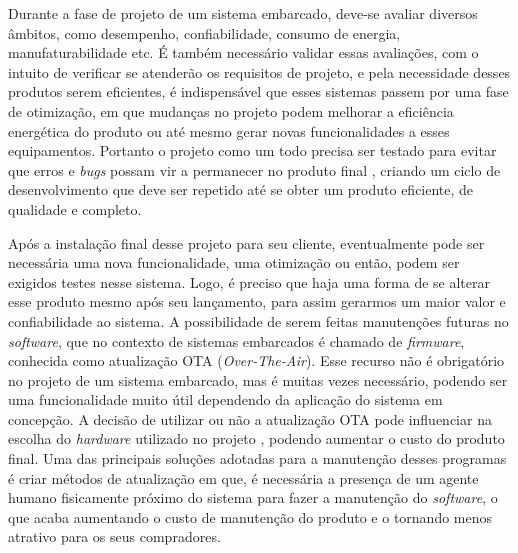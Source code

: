 

Durante a fase de projeto de um sistema embarcado, deve-se avaliar diversos âmbitos, como desempenho, confiabilidade, consumo de energia, manufaturabilidade etc. É também necessário validar essas avaliações, com o intuito de verificar se atenderão os requisitos de projeto, e pela necessidade desses produtos serem eficientes, é indispensável que esses sistemas passem por uma fase de otimização, em que mudanças no projeto podem melhorar a eficiência energética do produto ou até mesmo gerar novas funcionalidades a esses equipamentos. Portanto o projeto como um todo precisa ser testado para evitar que erros e \textit{bugs} possam vir a permanecer no produto final \cite{Marwedel2006}, criando um ciclo de desenvolvimento que deve ser repetido até se obter um produto eficiente, de qualidade e completo.

Após a instalação final desse projeto para seu cliente, eventualmente pode ser necessária uma nova funcionalidade, uma otimização ou então, podem ser exigidos testes nesse sistema. Logo, é preciso que haja uma forma de se alterar esse produto mesmo após seu lançamento, para assim gerarmos um maior valor e confiabilidade ao sistema.
A possibilidade de serem feitas manutenções futuras no \textit{software}, que no contexto de sistemas embarcados é chamado de \textit{firmware}, conhecida como atualização OTA (\textit{Over-The-Air}). Esse recurso não é obrigatório no projeto de um sistema embarcado, mas é muitas vezes necessário, podendo ser uma funcionalidade muito útil dependendo da aplicação do sistema em concepção. A decisão de utilizar ou não a atualização OTA pode influenciar na escolha do \textit{hardware} utilizado no projeto \cite{Ball2002}, 
podendo aumentar o custo do produto final.
Uma das principais soluções adotadas para a manutenção desses programas é criar métodos de atualização em que, é necessária a presença de um agente humano fisicamente próximo do sistema para fazer a manutenção do \textit{software}, o que acaba aumentando o custo de manutenção do produto e o tornando menos atrativo para os seus compradores.

